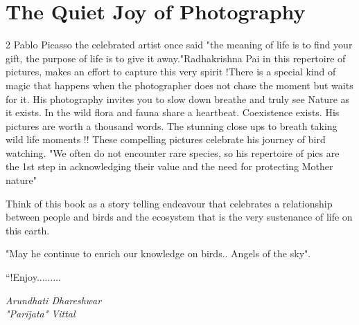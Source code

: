 \documentclass[12pt]{article}
\newcommand{\attribution}[1]{%
  \par\vspace{2em}%
  \begin{flushright}\itshape #1\end{flushright}%
}
\begin{document}
\section*{The Quiet Joy of Photography}
\begin{multicols}{2}
\noindent Pablo Picasso the celebrated artist once said "the meaning of life is to find your gift, the purpose of life is to give it away."Radhakrishna Pai in this repertoire of pictures, makes an effort to capture this very spirit !There is a special kind of magic that happens when the photographer does not chase the moment but waits for it. His photography invites you to slow down breathe and truly see Nature as it exists. In the wild flora and fauna share a heartbeat. Coexistence exists. His pictures are worth a thousand words. The stunning close ups to breath taking wild life moments !! These compelling pictures celebrate his journey of bird watching. "We often do not encounter rare species, so his repertoire of pics are the 1st step in acknowledging their value and the need for protecting Mother nature"

Think of this book as a story telling endeavour that celebrates a relationship between people and birds and the ecosystem that is the very sustenance of life on this earth.

"May he continue to enrich our knowledge on birds.. Angels of the sky".

“!Enjoy.........

\end{multicols}
\attribution{Arundhati Dhareshwar\\"Parijata" Vittal}
\newpage
\end{document}
